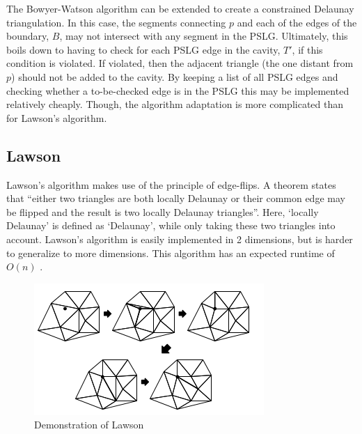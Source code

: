 The Bowyer-Watson algorithm can be extended to create a constrained Delaunay triangulation.
In this case, the segments connecting $p$ and each of the edges of the boundary, $B$, may not
intersect with any segment in the PSLG.
Ultimately, this boils down to having to check for each PSLG edge in the cavity, $T'$, if this condition is violated.
If violated, then the adjacent triangle (the one distant from $p$) should not be added to the cavity.
By keeping a list of all PSLG edges and checking whether a to-be-checked edge is in the PSLG this may be implemented relatively cheaply.
Though, the algorithm adaptation is more complicated than for Lawson's algorithm.

\subsection{Lawson}
\label{sub:lawson}
Lawson's algorithm makes use of the principle of edge-flips.
A theorem states that ``either two triangles are both locally Delaunay or their common edge may be flipped
and the result is two locally Delaunay triangles''.
Here, `locally Delaunay' is defined as `Delaunay', while only taking these two triangles into account.
Lawson's algorithm is easily implemented in 2 dimensions, but is harder to generalize to more dimensions.
This algorithm has an expected runtime of $O(n)$ \cite{shewchuk}.

\begin{figure}
    \includegraphics[width=\columnwidth]{../images/Lawson.png}
    \caption{Demonstration of Lawson}
\end{figure}

